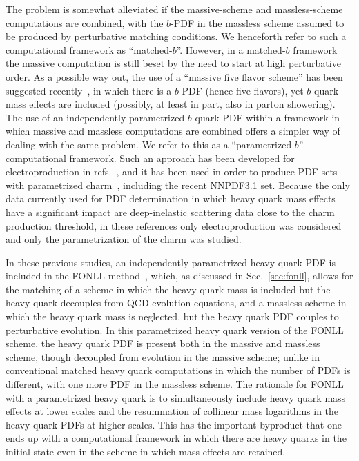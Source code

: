 The problem is somewhat
alleviated if the massive-scheme and massless-scheme
computations are combined, with the $b$-PDF in the massless scheme assumed to be
produced by perturbative matching conditions.  We  henceforth refer to
such a computational 
framework as ``matched-$b$''. However, in a matched-$b$ framework the
massive computation is still beset by the need to start at high
perturbative order.
As a possible way out, the use of a ``massive five flavor scheme'' has
been suggested recently~\cite{Krauss:2017wmx,Figueroa:2018chn}, in
which there is a $b$ PDF (hence five flavors), yet $b$ quark mass
effects are included (possibly, at least in part, also in parton showering).
The use of an independently parametrized $b$ quark PDF
within a framework in which massive and massless computations are
combined
offers a simpler way of dealing with the same
problem. We  refer to this as a ``parametrized $b$''
computational framework.
Such an approach has been developed for electroproduction in
refs.~\cite{Ball:2015tna,Ball:2015dpa}, and it has been used in order
to produce PDF sets with parametrized
charm~\cite{Ball:2016neh,Ball:2017nwa}, including the recent NNPDF3.1
set. Because the only data currently used for PDF determination in which 
heavy quark mass effects have  a significant impact are deep-inelastic
scattering data close  to the charm production threshold, in these
references only electroproduction was considered and only the
parametrization of the charm was studied.

In these previous studies, an independently parametrized heavy quark PDF is
included in the FONLL  method~\cite{Cacciari:1998it},
which, as discussed in Sec.~\ref{sec:fonll}, allows for the
matching of a scheme in which the heavy quark mass is included but the
heavy quark decouples from QCD evolution equations, and a massless
scheme in which the heavy quark mass is neglected, but the heavy quark
PDF couples to perturbative evolution.
In this parametrized heavy quark version of the FONLL scheme, the heavy
quark PDF is present both in the massive and massless scheme, though
decoupled from evolution in the massive scheme; unlike in conventional
matched heavy quark computations
in which the number of PDFs is different, with one more
PDF in the massless scheme. The rationale for FONLL
with a parametrized heavy quark is to simultaneously include heavy quark
mass effects at lower scales and
the resummation of collinear mass logarithms in the heavy quark PDFs at
higher scales. This has the important byproduct that one
ends up with a computational framework in which there are heavy quarks in
the initial state even in the scheme in which mass effects are
retained.

